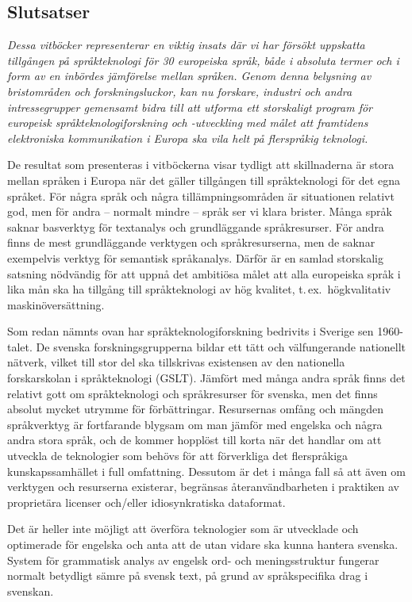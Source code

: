 \begin{multicols}{2}
\subsection{Slutsatser}

\emph{Dessa vitböcker representerar en viktig insats där vi har
  försökt uppskatta tillgången på språkteknologi för 30 europeiska
  språk, både i absoluta termer och i form av en inbördes jäm\-förelse
  mellan språken. Genom denna belys\-ning av brist\-områden och
  forsknings\-luckor, kan nu forskare, industri och andra
  intresse\-grupper gemen\-samt bidra till att utforma ett
  stor\-skaligt program för europeisk språk\-tekno\-logi\-forsk\-ning
  och -utveckling med målet att framtidens elektroniska kommunikation
  i Europa ska vila helt på fler\-språkig teknologi.}

De resultat som presenteras i vitböckerna visar tydligt att
skillnaderna är stora mellan språken i Europa när det gäller
tillgången till språkteknologi för det egna språket. För några språk
och några tillämpningsområden är situationen relativt god, men för
andra -- normalt mindre -- språk ser vi klara brister. Många språk
saknar basverktyg för textanalys och grundläggande språkresurser. För
andra finns de mest grundläggande verktygen och språkresurserna, men
de saknar exempelvis verktyg för semantisk språkanalys. Därför är en
samlad storskalig satsning nödvändig för att uppnå det ambitiösa målet
att alla europeiska språk i lika mån ska ha tillgång till
språkteknologi av hög kvalitet, t.\,ex.~högkvalitativ
maskin\-över\-sätt\-ning.

Som redan nämnts ovan har språkteknologiforskning bedrivits i Sverige
sen 1960-talet. De svenska forskningsgrupperna bildar ett tätt och
välfungerande nationellt nätverk, vilket till stor del ska tillskrivas
existensen av den nationella forskarskolan i språkteknologi
(GSLT). Jämfört med många andra språk finns det relativt gott om
språkteknologi och språkresurser för svenska, men det finns absolut
mycket utrymme för förbättringar. Resursernas omfång och mängden
språkverktyg är fortfarande blygsam om man jämför med engelska och
några andra stora språk, och de kommer hopplöst till korta när det
handlar om att utveckla de teknologier som behövs för att förverkliga
det flerspråkiga kunskapssamhället i full omfattning. Dessutom är det
i många fall så att även om verktygen och resurserna existerar,
begränsas återanvändbarheten i praktiken av proprietära licenser
och/eller idiosynkratiska dataformat.

Det är heller inte möjligt att överföra teknologier som är utvecklade
och optimerade för engelska och anta att de utan vidare ska kunna
hantera svenska. System för grammatisk analys av engelsk ord- och
meningsstruktur fungerar normalt betydligt sämre på svensk text, på
grund av språkspecifika drag i svenskan.


\end{multicols}
